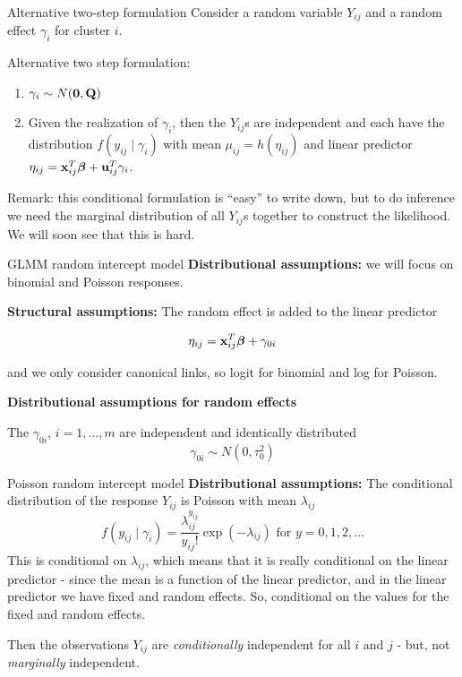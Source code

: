 \documentclass[
  ignorenonframetext,
]{beamer}
\providecommand{\tightlist}{%
  \setlength{\itemsep}{0pt}\setlength{\parskip}{0pt}}
\begin{document}
\begin{frame}
\begin{block}{Alternative two-step formulation}
\protect{}\label{alternative-two-step-formulation}
Consider a random variable \(Y_{ij}\) and a random effect \(\gamma_i\)
for cluster \(i\).

Alternative two step formulation:

\begin{enumerate}
\tightlist
\item
  \(\gamma_i \sim N({\bf 0},{\bf Q})\)
\item
  Given the realization of \(\gamma_i\), then the \(Y_{ij}\)s are
  independent and each have the distribution \(f(y_{ij}\mid \gamma_i)\)
  with mean \(\mu_{ij}=h(\eta_{ij})\) and linear predictor
  \(\eta_{ij}={\bf x}_{ij}^T {\boldsymbol \beta}+ {\bf u}^T_{ij} \gamma_i\).
\end{enumerate}

Remark: this conditional formulation is ``easy'' to write down, but to
do inference we need the marginal distribution of all \(Y_{ij}\)s
together to construct the likelihood. We will soon see that this is
hard.
\end{block}
\end{frame}

\begin{frame}{GLMM random intercept model}
\protect{}\label{glmm-random-intercept-model}
\textbf{Distributional assumptions:} we will focus on binomial and
Poisson responses.

\textbf{Structural assumptions:} The random effect is added to the
linear predictor

\[\eta_{ij}={\bf x}_{ij}^T {\boldsymbol \beta}+ \gamma_{0i}\]

and we only consider canonical links, so logit for binomial and log for
Poisson.

\textbf{Distributional assumptions for random effects}

The \(\gamma_{0i}\), \(i=1,\ldots,m\) are independent and identically
distributed \[\gamma_{0i}\sim N(0,\tau_0^2)\]
\end{frame}

\begin{frame}
\begin{block}{Poisson random intercept model}
\protect{}\label{poisson-random-intercept-model}
\textbf{Distributional assumptions:} The conditional distribution of the
response \(Y_{ij}\) is Poisson with mean \(\lambda_{ij}\) \[
f(y_{ij}\mid \gamma_i)=\frac{\lambda_{ij}^{y_{ij}}}{y_{ij}!}\exp(-\lambda_{ij}) \text{ for } y=0,1,2,\ldots
\] This is conditional on \(\lambda_{ij}\), which means that it is
really conditional on the linear predictor - since the mean is a
function of the linear predictor, and in the linear predictor we have
fixed and random effects. So, conditional on the values for the fixed
and random effects.

Then the observations \(Y_{ij}\) are \emph{conditionally} independent
for all \(i\) and \(j\) - but, not \emph{marginally} independent.
\end{block}
\end{frame}
\end{document}
